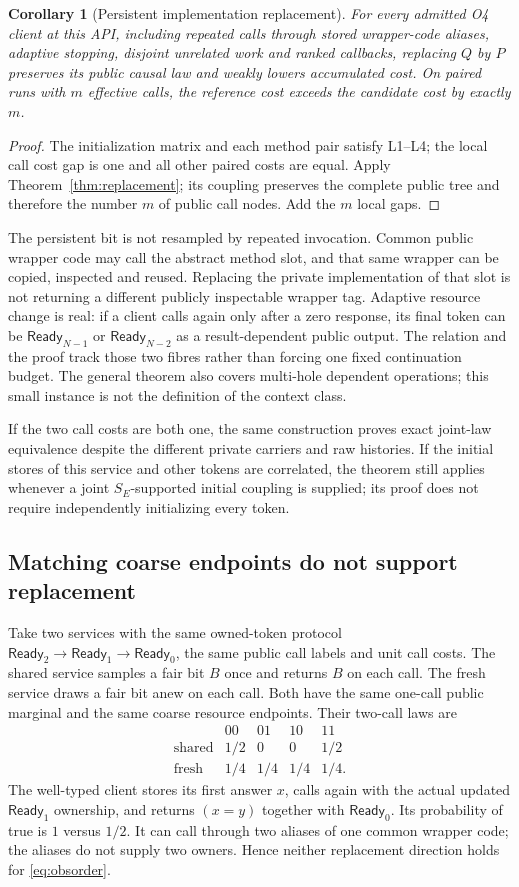 \documentclass[11pt,a4paper]{article}
\newtheorem{corollary}[theorem]{Corollary}
\theoremstyle{definition}
\newcommand{\Ready}{\mathsf{Ready}}
\begin{document}
\begin{corollary}[Persistent implementation replacement]
\label{cor:persistent}
For every admitted O4 client at this API, including repeated calls through
stored wrapper-code aliases, adaptive stopping, disjoint unrelated work
and ranked callbacks, replacing $Q$ by $P$ preserves its public causal
law and weakly lowers accumulated cost. On paired runs with $m$ effective
calls, the reference cost exceeds the candidate cost by exactly $m$.
\end{corollary}
\begin{proof}
The initialization matrix and each method pair satisfy L1--L4; the local
call cost gap is one and all other paired costs are equal. Apply
Theorem~\ref{thm:replacement}; its coupling preserves the complete
public tree and therefore the number $m$ of public call nodes. Add the
$m$ local gaps.
\end{proof}
The persistent bit is not resampled by repeated invocation. Common public
wrapper code may call the abstract method slot, and that same wrapper can
be copied, inspected and reused. Replacing the private implementation of
that slot is not returning a different publicly inspectable wrapper tag.
Adaptive resource change is real: if a client calls again only after a
zero response, its final token can be $\Ready_{N-1}$ or
$\Ready_{N-2}$ as a result-dependent public output. The relation and the
proof track those two fibres rather than forcing one fixed continuation
budget. The general theorem also covers multi-hole dependent operations;
this small instance is not the definition of the context class.

If the two call costs are both one, the same construction proves exact
joint-law equivalence despite the different private carriers and raw
histories. If the initial stores of this service and other tokens are
correlated, the theorem still applies whenever a joint $S_E$-supported
initial coupling is supplied; its proof does not require independently
initializing every token.

\subsection{Matching coarse endpoints do not support replacement}
Take two services with the same owned-token protocol
$\Ready_2\to\Ready_1\to\Ready_0$, the same public call labels and
unit call costs. The shared service samples a fair bit $B$ once and
returns $B$ on each call. The fresh service draws a fair bit anew on each
call. Both have the same one-call public marginal and the same coarse
resource endpoints. Their two-call laws are
\[
\begin{array}{c|rrrr}
 &00&01&10&11\\\hline
 \text{shared}&1/2&0&0&1/2\\
 \text{fresh}&1/4&1/4&1/4&1/4.
\end{array}
\]
The well-typed client stores its first answer $x$, calls again with the
actual updated $\Ready_1$ ownership, and returns $(x=y)$ together with
$\Ready_0$. Its probability of true is $1$ versus $1/2$. It can call
through two aliases of one common wrapper code; the aliases do not
supply two owners. Hence neither replacement direction holds for
\eqref{eq:obsorder}.
\end{document}
